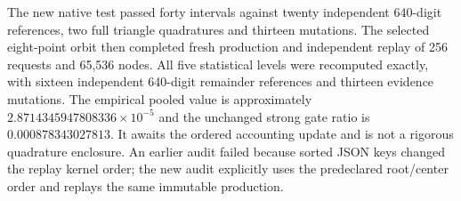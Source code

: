 \documentclass[11pt]{article}
\begin{document}
The new native test passed forty intervals against twenty independent
640-digit references, two full triangle quadratures and thirteen
mutations. The selected eight-point orbit then completed fresh production
and independent replay of 256 requests and 65,536 nodes. All five
statistical levels were recomputed exactly, with sixteen independent
640-digit remainder references and thirteen evidence mutations.
The empirical pooled value is approximately
$2.8714345947808336\times10^{-5}$ and the unchanged strong gate ratio
is $0.000878343027813$.
It awaits the ordered accounting update and is not a rigorous
quadrature enclosure. An earlier audit failed because sorted JSON keys
changed the replay kernel order; the new audit explicitly uses the
predeclared root/center order and replays the same immutable production.
\end{document}

